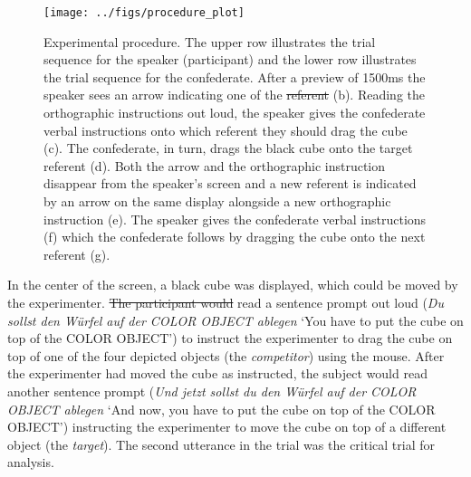 \documentclass[Review,times,sageh]{sagej}
\providecommand{\DIFaddtex}[1]{{\protect\color{blue}\uwave{#1}}} %
\providecommand{\DIFdeltex}[1]{{\protect\color{red}\sout{#1}}}                      %
\providecommand{\DIFaddbegin}{} %
\providecommand{\DIFaddend}{} %
\providecommand{\DIFdelbegin}{} %
\providecommand{\DIFdelend}{} %
\providecommand{\DIFaddFL}[1]{\DIFadd{#1}} %
\providecommand{\DIFdelFL}[1]{\DIFdel{#1}} %
\providecommand{\DIFaddbeginFL}{} %
\providecommand{\DIFaddendFL}{} %
\providecommand{\DIFdelbeginFL}{} %
\providecommand{\DIFdelendFL}{} %
\providecommand{\DIFadd}[1]{\texorpdfstring{\DIFaddtex{#1}}{#1}} %
\providecommand{\DIFdel}[1]{\texorpdfstring{\DIFdeltex{#1}}{}} %
\begin{document}
\begin{figure}
\DIFdelbeginFL %
\DIFdelendFL \DIFaddbeginFL \texttt{[image: ../figs/procedure\_plot]} \DIFaddendFL \caption{Experimental procedure. The upper row illustrates the trial sequence for the speaker (participant) and the lower row illustrates the trial sequence for the confederate. After a preview of 1500ms the speaker sees an arrow indicating one of the \DIFdelbeginFL \DIFdelFL{referent }\DIFdelendFL \DIFaddbeginFL \DIFaddFL{referents }\DIFaddendFL (b). Reading the orthographic instructions out loud, the speaker gives the confederate verbal instructions onto which referent they should drag the cube (c). The confederate, in turn, drags the black cube onto the target referent (d). Both the arrow and the orthographic instruction disappear from the speaker's screen and a new referent is indicated by an arrow on the same display alongside a new orthographic instruction (e). The speaker gives the confederate verbal instructions (f) which the confederate follows by dragging the cube onto the next referent (g).}\label{fig:procedural}
\end{figure}

In the center of the screen, a black cube was displayed, which could be moved by the experimenter.
\DIFdelbegin \DIFdel{The participant would }\DIFdelend \DIFaddbegin \DIFadd{Participant }\DIFaddend read a sentence prompt out loud (\emph{Du sollst den Würfel auf der COLOR OBJECT ablegen} `You have to put the cube on top of the COLOR OBJECT') to instruct the experimenter to drag the cube on top of one of the four depicted objects (the \emph{competitor}) using the mouse.
After the experimenter had moved the cube as instructed, the subject would read another sentence prompt (\emph{Und jetzt sollst du den Würfel auf der COLOR OBJECT ablegen} `And now, you have to put the cube on top of the COLOR OBJECT') instructing the experimenter to move the cube on top of a different object (the \emph{target}).
The second utterance in the trial was the critical trial for analysis.
\end{document}
